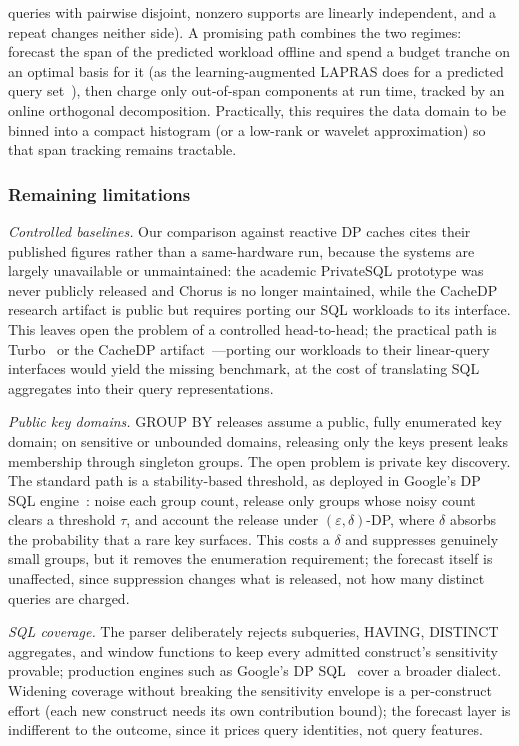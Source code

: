 \documentclass[sigconf,nonacm]{acmart}
\newcommand{\eps}{\varepsilon}
\begin{document}
queries with pairwise disjoint, nonzero supports are linearly independent, and a repeat changes neither side). A promising path combines the two regimes: forecast the span of the predicted workload offline and spend a budget tranche on an optimal basis for it (as the learning-augmented LAPRAS does for a predicted query set~\cite{mundra2026lapras}), then charge only out-of-span components at run time, tracked by an online orthogonal decomposition. Practically, this requires the data domain to be binned into a compact histogram (or a low-rank or wavelet approximation) so that span tracking remains tractable.

\subsubsection*{Remaining limitations}
\emph{Controlled baselines.} Our comparison against reactive DP caches cites their published figures rather than a same-hardware run, because the systems are largely unavailable or unmaintained: the academic PrivateSQL prototype was never publicly released and Chorus is no longer maintained, while the CacheDP research artifact is public but requires porting our SQL workloads to its interface. This leaves open the problem of a controlled head-to-head; the practical path is Turbo~\cite{kostopoulou2023turbo} or the CacheDP artifact~\cite{mazmudar2023cachedp}---porting our workloads to their linear-query interfaces would yield the missing benchmark, at the cost of translating SQL aggregates into their query representations.

\emph{Public key domains.} GROUP BY releases assume a public, fully enumerated key domain; on sensitive or unbounded domains, releasing only the keys present leaks membership through singleton groups. The open problem is private key discovery. The standard path is a stability-based threshold, as deployed in Google's DP SQL engine~\cite{wilson2020googledp}: noise each group count, release only groups whose noisy count clears a threshold $\tau$, and account the release under $(\eps,\delta)$-DP, where $\delta$ absorbs the probability that a rare key surfaces. This costs a $\delta$ and suppresses genuinely small groups, but it removes the enumeration requirement; the forecast itself is unaffected, since suppression changes what is released, not how many distinct queries are charged.

\emph{SQL coverage.} The parser deliberately rejects subqueries, HAVING, DISTINCT aggregates, and window functions to keep every admitted construct's sensitivity provable; production engines such as Google's DP SQL~\cite{wilson2020googledp} cover a broader dialect. Widening coverage without breaking the sensitivity envelope is a per-construct effort (each new construct needs its own contribution bound); the forecast layer is indifferent to the outcome, since it prices query identities, not query features.
\end{document}
